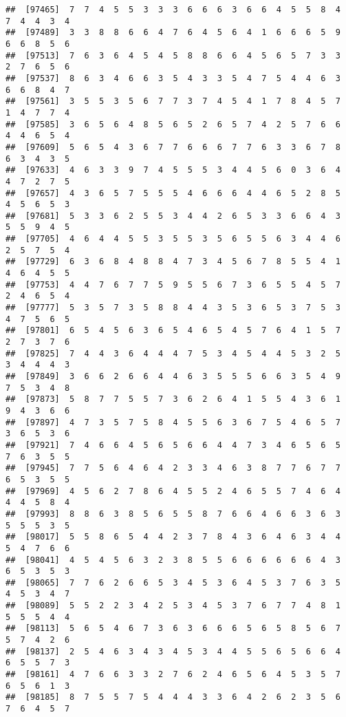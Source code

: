 \documentclass[
]{book}
\begin{document}
\begin{verbatim}
##  [97465]  7  7  4  5  5  3  3  3  6  6  6  3  6  6  4  5  5  8  4  7  4  4  3  4
##  [97489]  3  3  8  8  6  6  4  7  6  4  5  6  4  1  6  6  6  5  9  6  6  8  5  6
##  [97513]  7  6  3  6  4  5  4  5  8  8  6  6  4  5  6  5  7  3  3  2  7  6  5  6
##  [97537]  8  6  3  4  6  6  3  5  4  3  3  5  4  7  5  4  4  6  3  6  6  8  4  7
##  [97561]  3  5  5  3  5  6  7  7  3  7  4  5  4  1  7  8  4  5  7  1  4  7  7  4
##  [97585]  3  6  5  6  4  8  5  6  5  2  6  5  7  4  2  5  7  6  6  4  4  6  5  4
##  [97609]  5  6  5  4  3  6  7  7  6  6  6  7  7  6  3  3  6  7  8  6  3  4  3  5
##  [97633]  4  6  3  3  9  7  4  5  5  5  3  4  4  5  6  0  3  6  4  4  7  2  7  5
##  [97657]  4  3  6  5  7  5  5  5  4  6  6  6  4  4  6  5  2  8  5  4  5  6  5  3
##  [97681]  5  3  3  6  2  5  5  3  4  4  2  6  5  3  3  6  6  4  3  5  5  9  4  5
##  [97705]  4  6  4  4  5  5  3  5  5  3  5  6  5  5  6  3  4  4  6  2  5  7  5  4
##  [97729]  6  3  6  8  4  8  8  4  7  3  4  5  6  7  8  5  5  4  1  4  6  4  5  5
##  [97753]  4  4  7  6  7  7  5  9  5  5  6  7  3  6  5  5  4  5  7  2  4  6  5  4
##  [97777]  5  3  5  7  3  5  8  8  4  4  3  5  3  6  5  3  7  5  3  4  7  5  6  5
##  [97801]  6  5  4  5  6  3  6  5  4  6  5  4  5  7  6  4  1  5  7  2  7  3  7  6
##  [97825]  7  4  4  3  6  4  4  4  7  5  3  4  5  4  4  5  3  2  5  3  4  4  4  3
##  [97849]  3  6  6  2  6  6  4  4  6  3  5  5  5  6  6  3  5  4  9  7  5  3  4  8
##  [97873]  5  8  7  7  5  5  7  3  6  2  6  4  1  5  5  4  3  6  1  9  4  3  6  6
##  [97897]  4  7  3  5  7  5  8  4  5  5  6  3  6  7  5  4  6  5  7  3  6  5  3  6
##  [97921]  7  4  6  6  4  5  6  5  6  6  4  4  7  3  4  6  5  6  5  7  6  3  5  5
##  [97945]  7  7  5  6  4  6  4  2  3  3  4  6  3  8  7  7  6  7  7  6  5  3  5  5
##  [97969]  4  5  6  2  7  8  6  4  5  5  2  4  6  5  5  7  4  6  4  4  4  5  8  4
##  [97993]  8  8  6  3  8  5  6  5  5  8  7  6  6  4  6  6  3  6  3  5  5  5  3  5
##  [98017]  5  5  8  6  5  4  4  2  3  7  8  4  3  6  4  6  3  4  4  5  4  7  6  6
##  [98041]  4  5  4  5  6  3  2  3  8  5  5  6  6  6  6  6  6  4  3  6  5  3  5  3
##  [98065]  7  7  6  2  6  6  5  3  4  5  3  6  4  5  3  7  6  3  5  4  5  3  4  7
##  [98089]  5  5  2  2  3  4  2  5  3  4  5  3  7  6  7  7  4  8  1  5  5  5  4  4
##  [98113]  5  6  5  4  6  7  3  6  3  6  6  6  5  6  5  8  5  6  7  5  7  4  2  6
##  [98137]  2  5  4  6  3  4  3  4  5  3  4  4  5  5  6  5  6  6  4  6  5  5  7  3
##  [98161]  4  7  6  6  3  3  2  7  6  2  4  6  5  6  4  5  3  5  7  6  5  6  1  3
##  [98185]  8  7  5  5  7  5  4  4  4  3  3  6  4  2  6  2  3  5  6  7  6  4  5  7

\end{verbatim}
\end{document}
